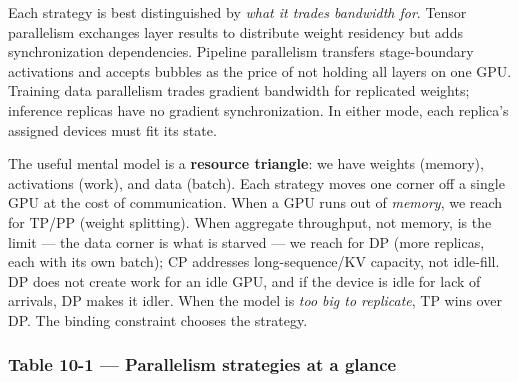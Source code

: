 \label{mental-model}


Each strategy is best distinguished by \emph{what it trades bandwidth
for}. Tensor parallelism exchanges layer results to distribute weight
residency but adds synchronization dependencies. Pipeline parallelism
transfers stage-boundary activations and accepts bubbles as the price of
not holding all layers on one GPU. Training data parallelism trades
gradient bandwidth for replicated weights; inference replicas have no
gradient synchronization. In either mode, each replica's assigned
devices must fit its state.

The useful mental model is a \textbf{resource triangle}: we have weights
(memory), activations (work), and data (batch). Each strategy moves one
corner off a single GPU at the cost of communication. When a GPU runs
out of \emph{memory}, we reach for TP/PP (weight splitting). When
aggregate throughput, not memory, is the limit --- the data corner is
what is starved --- we reach for DP (more replicas, each with its own
batch); CP addresses long-sequence/KV capacity, not idle-fill. DP does
not create work for an idle GPU, and if the device is idle for lack of
arrivals, DP makes it idler. When the model is \emph{too big to
replicate}, TP wins over DP. The binding constraint chooses the
strategy.

\subsubsection{Table 10-1 --- Parallelism strategies at a
glance}\label{table-10-1-parallelism-strategies-at-a-glance}

